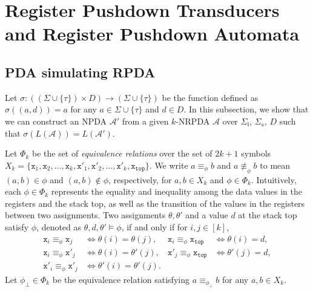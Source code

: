 \documentclass[oribibl,envcountsame,dvipdfmx]{llncs}
\renewcommand{\top}{\mathtt{top}}
\newcommand{\Ltop}{\L_{\top}}
\newcommand{\calA}{\mathcal{A}}
\renewcommand{\L}{\mathtt{x}}
\newcommand{\R}{\mathtt{x}'}
\newcommand{\phizero}{\phi_{\bot}}
\newcommand{\SigmaI}{\Sigma_{\mathbb{i}}}
\newcommand{\SigmaO}{\Sigma_{\mathbb{o}}}
\begin{document}
\section*{Register Pushdown Transducers and
  Register Pushdown Automata}

\subsection*{PDA simulating RPDA}

Let $\sigma:((\Sigma\cup\{\tau\})\times D)\to(\Sigma\cup\{\tau\})$
be the function
defined as $\sigma((a,d))=a$
for any $a\in\Sigma\cup\{\tau\}$ and $d\in D$.
In this subsection, we show that we can construct an NPDA $\calA'$
from a given $k$-NRPDA $\calA$ over $\SigmaI$, $\SigmaO$, $D$
such that $\sigma(L(\calA))=L(\calA')$.

Let $\Phi_k$ be the set of
\emph{equivalence relations}
over the set of $2k+1$ symbols
$X_k=\{
 \L_1,\L_2,\ldots,\L_k,
 \R_1,\R_2,\ldots,\R_k,
 \Ltop \}$.
 We write $a\equiv_{\phi}b$ and $a\not\equiv_{\phi}b$ to mean
 $(a,b)\in\phi$ and $(a,b)\notin\phi$, respectively,
for $a,b\in X_k$ and $\phi\in\Phi_k$.
%
Intuitively,
each $\phi\in\Phi_k$ represents the equality and inequality
among the data values in the registers and the stack top,
as well as the transition of the values in the registers
between two assignments.
Two assignments $\theta,\theta'$ and a value $d$ at the stack top
satisfy $\phi$,
denoted as $\theta,d,\theta'\models\phi$,
if and only if for $i,j\in[k]$,
\begin{align*}
  \L_i\equiv_{\phi}\L_j &\Leftrightarrow \theta(i)=\theta(j),
  & \L_i\equiv_{\phi}\Ltop &\Leftrightarrow \theta(i)=d, \\
  \L_i\equiv_{\phi}\R_j &\Leftrightarrow \theta(i)=\theta'(j),
  & \R_j\equiv_{\phi}\Ltop &\Leftrightarrow \theta'(j)=d , \\
  \R_i\equiv_{\phi}\R_j &\Leftrightarrow \theta'(i)=\theta'(j).
\end{align*}
%
Let $\phizero\in\Phi_k$ be the equivalence relation
satisfying $a\equiv_{\phizero}b$ for any $a,b\in X_k$.
\end{document}
